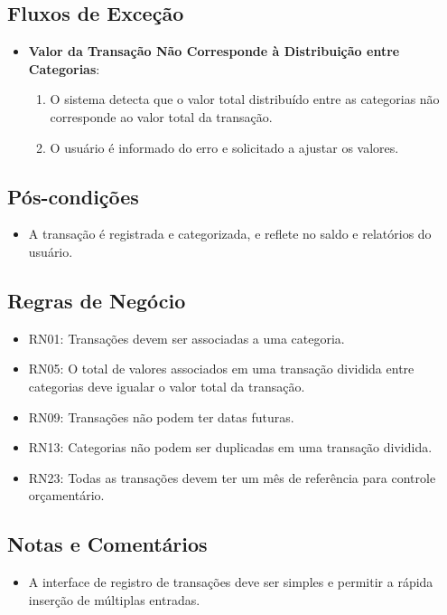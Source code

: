 \subsection*{Fluxos de Exceção}
\begin{addmargin}[1.5cm]{0cm}
	\begin{itemize}
		\item \textbf{Valor da Transação Não Corresponde à Distribuição entre Categorias}:
		      \begin{enumerate}
		      	\item O sistema detecta que o valor total distribuído entre as categorias não corresponde ao valor total da transação.
		      	\item O usuário é informado do erro e solicitado a ajustar os valores.
		      \end{enumerate}
	\end{itemize}
\end{addmargin}

\subsection*{Pós-condições}
\begin{addmargin}[1.5cm]{0cm}
	\begin{itemize}
		\item A transação é registrada e categorizada, e reflete no saldo e relatórios do usuário.
	\end{itemize}
\end{addmargin}

\subsection*{Regras de Negócio}
\begin{addmargin}[1.5cm]{0cm}
	\begin{itemize}
		\item RN01: Transações devem ser associadas a uma categoria.
		\item RN05: O total de valores associados em uma transação dividida entre categorias deve igualar o valor total da transação.
		\item RN09: Transações não podem ter datas futuras.
		\item RN13: Categorias não podem ser duplicadas em uma transação dividida.
		\item RN23: Todas as transações devem ter um mês de referência para controle orçamentário.
	\end{itemize}
\end{addmargin}

\subsection*{Notas e Comentários}
\begin{addmargin}[1.5cm]{0cm}
	\begin{itemize}
		\item A interface de registro de transações deve ser simples e permitir a rápida inserção de múltiplas entradas.
	\end{itemize}
\end{addmargin}
